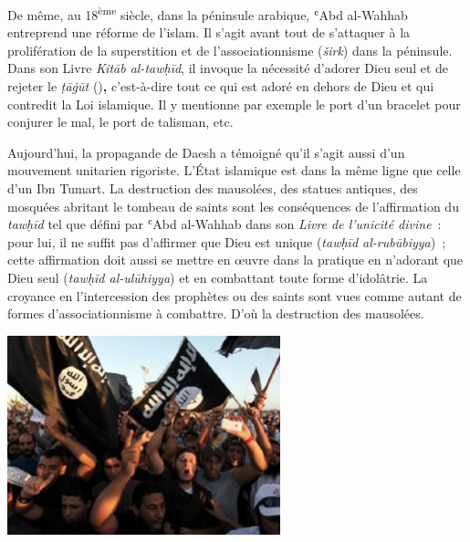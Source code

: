  

De même, au 18\textsuperscript{ème} siècle, dans la péninsule arabique,
ʿAbd al-Wahhab entreprend une réforme de l'islam. Il s'agit avant tout
de s'attaquer à la prolifération de la superstition et de
l'associationnisme (\emph{širk}) dans la péninsule. Dans son Livre
\emph{Kitāb al-tawḥīd}, il invoque la nécessité d'adorer Dieu seul et de
rejeter le \emph{ṭāġūt} (\textbf{})\textbf{,} c'est-à-dire
tout ce qui est adoré en dehors de Dieu et qui contredit la Loi
islamique. Il y mentionne par exemple le port d'un bracelet pour
conjurer le mal, le port de talisman, etc.

Aujourd'hui, la propagande de Daesh a témoigné qu'il s'agit aussi d'un
mouvement unitarien rigoriste. L'État islamique est dans la même ligne
que celle d'un Ibn Tumart. La destruction des mausolées, des statues
antiques, des mosquées abritant le tombeau de saints sont les
conséquences de l'affirmation du \emph{tawḥīd} tel que défini par ʿAbd
al-Wahhab dans son \emph{Livre de l'unicité divine}~: pour lui, il ne
suffit pas d'affirmer que Dieu est unique (\emph{tawḥīd al-rubūbiyya})~;
cette affirmation doit aussi se mettre en œuvre dans la pratique en
n'adorant que Dieu seul (\emph{tawḥīd al-ulūhiyya}) et en combattant
toute forme d'idolâtrie. La croyance en l'intercession des prophètes ou
des saints sont vues comme autant de formes d'associationnisme à
combattre. D'où la destruction des mausolées.

\includegraphics[width=3.11458in,height=2.28125in]{Images/image072.jpg}

